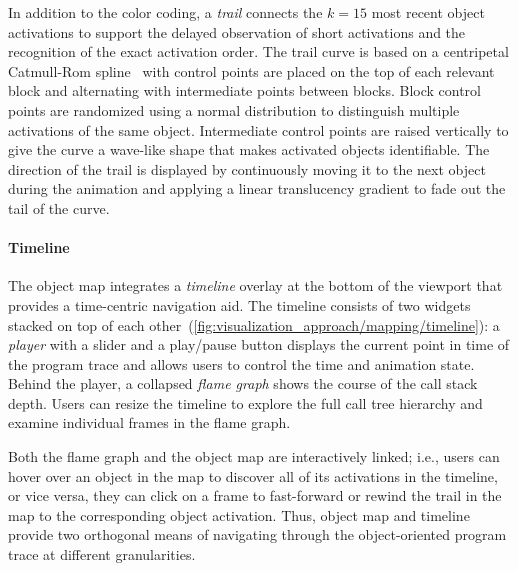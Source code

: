 In addition to the color coding, a \emph{trail} connects the $k = 15$ most recent object activations to support the delayed observation of short activations and the recognition of the exact activation order.
The trail curve is based on a centripetal Catmull-Rom spline~\cite{catmull1974class} with control points are placed on the top of each relevant block and alternating with intermediate points between blocks.
Block control points are randomized using a normal distribution to distinguish multiple activations of the same object.
Intermediate control points are raised vertically to give the curve a wave-like shape that makes activated objects identifiable.
The direction of the trail is displayed by continuously moving it to the next object during the animation and applying a linear translucency gradient to fade out the tail of the curve.

\paragraph{Timeline}
\label{sec:visualization_approach/mapping/timeline}

The object map integrates a \emph{timeline} overlay at the bottom of the viewport that provides a time-centric navigation aid.
The timeline consists of two widgets stacked on top of each other~(\cref{fig:visualization_approach/mapping/timeline}):
a \emph{player} with a slider and a play/pause button displays the current point in time of the program trace and allows users to control the time and animation state.
Behind the player, a collapsed \emph{flame graph} shows the course of the call stack depth.
Users can resize the timeline to explore the full call tree hierarchy and examine individual frames in the flame graph.

Both the flame graph and the object map are interactively linked; i.e., users can hover over an object in the map to discover all of its activations in the timeline, or vice versa, they can click on a frame to fast-forward or rewind the trail in the map to the corresponding object activation.
Thus, object map and timeline provide two orthogonal means of navigating through the object-oriented program trace at different granularities.

